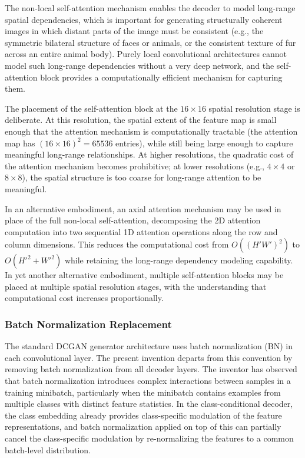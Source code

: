 \documentclass[12pt,letterpaper]{article}
\begin{document}
The non-local self-attention mechanism enables the decoder to model long-range
spatial dependencies, which is important for generating structurally coherent
images in which distant parts of the image must be consistent (e.g., the
symmetric bilateral structure of faces or animals, or the consistent texture
of fur across an entire animal body). Purely local convolutional architectures
cannot model such long-range dependencies without a very deep network, and the
self-attention block provides a computationally efficient mechanism for
capturing them.

The placement of the self-attention block at the $16 \times 16$ spatial
resolution stage is deliberate. At this resolution, the spatial extent of the
feature map is small enough that the attention mechanism is computationally
tractable (the attention map has $(16 \times 16)^2 = 65536$ entries), while
still being large enough to capture meaningful long-range relationships. At
higher resolutions, the quadratic cost of the attention mechanism becomes
prohibitive; at lower resolutions (e.g., $4 \times 4$ or $8 \times 8$), the
spatial structure is too coarse for long-range attention to be meaningful.

In an alternative embodiment, an axial attention mechanism may be used in
place of the full non-local self-attention, decomposing the 2D attention
computation into two sequential 1D attention operations along the row and
column dimensions. This reduces the computational cost from $O((H'W')^2)$ to
$O(H'^2 + W'^2)$ while retaining the long-range dependency modeling capability.
In yet another alternative embodiment, multiple self-attention blocks may be
placed at multiple spatial resolution stages, with the understanding that
computational cost increases proportionally.

\subsubsection{Batch Normalization Replacement}

The standard DCGAN generator architecture uses batch normalization (BN) in each
convolutional layer. The present invention departs from this convention by
removing batch normalization from all decoder layers. The inventor has observed
that batch normalization introduces complex interactions between samples in a
training minibatch, particularly when the minibatch contains examples from
multiple classes with distinct feature statistics. In the class-conditional
decoder, the class embedding already provides class-specific modulation of the
feature representations, and batch normalization applied on top of this can
partially cancel the class-specific modulation by re-normalizing the features
to a common batch-level distribution.
\end{document}
